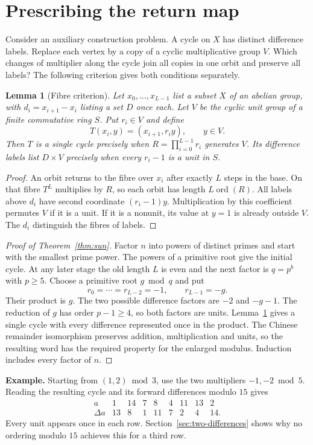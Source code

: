 \documentclass[11pt,a4paper]{article}
\newtheorem{lemma}[theorem]{Lemma}
\begin{document}
\section{Prescribing the return map}
Consider an auxiliary construction problem. A cycle on $X$ has distinct difference labels. Replace each vertex by a copy of a cyclic multiplicative group $V$. Which changes of multiplier along the cycle join all copies in one orbit and preserve all labels? The following criterion gives both conditions separately.
\begin{lemma}[Fibre criterion]\label{lem:lift}
Let $x_0,\ldots,x_{L-1}$ list a subset $X$ of an abelian group, with $d_i=x_{i+1}-x_i$ listing a set $D$ once each. Let $V$ be the cyclic unit group of a finite commutative ring $S$. Put $r_i\in V$ and define
\[
                   T(x_i,y)=(x_{i+1},r_i y),\qquad y\in V .
\]
Then $T$ is a single cycle precisely when $R=\prod_{i=0}^{L-1}r_i$ generates $V$. Its difference labels list $D\times V$ precisely when every $r_i-1$ is a unit in $S$.
\end{lemma}
\begin{proof}
An orbit returns to the fibre over $x_i$ after exactly $L$ steps in the base. On that fibre $T^L$ multiplies by $R$, so each orbit has length $L\operatorname{ord}(R)$. All labels above $d_i$ have second coordinate $(r_i-1)y$. Multiplication by this coefficient permutes $V$ if it is a unit. If it is a nonunit, its value at $y=1$ is already outside $V$. The $d_i$ distinguish the fibres of labels.
\end{proof}
\begin{proof}[Proof of Theorem~\ref{thm:sun}]
Factor $n$ into powers of distinct primes and start with the smallest prime power. The powers of a primitive root give the initial cycle. At any later stage the old length $L$ is even and the next factor is $q=p^b$ with $p\ge5$. Choose a primitive root $g\bmod q$ and put
\[
              r_0=\cdots=r_{L-2}=-1,\qquad r_{L-1}=-g .
\]
Their product is $g$. The two possible difference factors are $-2$ and $-g-1$. The reduction of $g$ has order $p-1\ge4$, so both factors are units. Lemma~\ref{lem:lift} gives a single cycle with every difference represented once in the product. The Chinese remainder isomorphism preserves addition, multiplication and units, so the resulting word has the required property for the enlarged modulus. Induction includes every factor of $n$.
\end{proof}
\noindent\textbf{Example.} Starting from $(1,2)\bmod3$, use the two multipliers $-1,-2\bmod5$. Reading the resulting cycle and its forward differences modulo $15$ gives
\[
\begin{array}{c|rrrrrrrr}
a&1&14&7&8&4&11&13&2\\
\Delta a&13&8&1&11&7&2&4&14 .
\end{array}
\]
Every unit appears once in each row. Section~\ref{sec:two-differences} shows why no ordering modulo $15$ achieves this for a third row.
\end{document}

